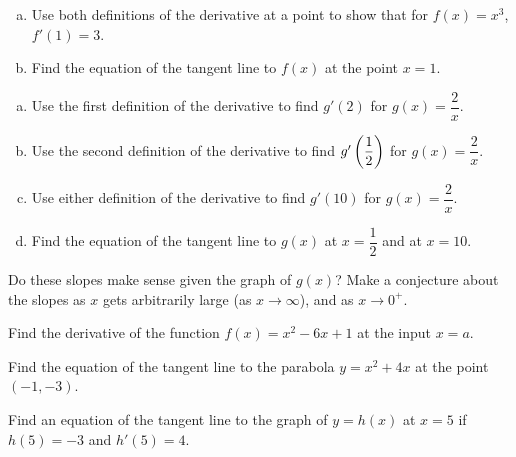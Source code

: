 \documentclass[notes]{subfiles}
\begin{document}
		\begin{ex}
			\begin{enumerate}[(a)]
				\item Use both definitions of the derivative at a point to show that for $f(x) = x^3$, $f'(1) = 3$.
					
				\item Find the equation of the tangent line to $f(x)$ at the point $x = 1$.
					
			\end{enumerate}
		\end{ex}
			\newpage		
		\begin{ex}
			\begin{enumerate}[(a)]
				\item Use the first definition of the derivative to find $g'(2)$ for $g(x) = \dfrac{2}{x}$.
					\vs{1}
					
				\item Use the second definition of the derivative to find $g'\left( \dfrac{1}{2}\right)$ for $g(x) = \dfrac{2}{x}$.
					\vs{1}
					
				\item Use either definition of the derivative to find $g'(10)$ for $g(x) = \dfrac{2}{x}$.
					\vs{1}
					
				\item Find the equation of the tangent line to $g(x)$ at $x = \dfrac{1}{2}$ and at $x = 10$.
					\vs{1}					
			\end{enumerate}  
		\end{ex}
			\newpage

		\begin{question}
			Do these slopes make sense given the graph of $g(x)$?  Make a conjecture about the slopes as $x$ gets arbitrarily large (as $x\to \infty$), and as $x\to 0^+$.
		\end{question}

		\begin{ex}
			Find the derivative of the function $f(x) = x^2-6x+1$ at the input $x = a$.
		\end{ex}
			\vs{2}
			
		\begin{ex}
			Find the equation of the tangent line to the parabola $y = x^2 + 4x$ at the point $(-1,-3)$.
		\end{ex}
			\vs{2}
			\newpage
			
		\begin{ex}
			Find an equation of the tangent line to the graph of $y = h(x)$ at $x = 5$ if $h(5) = -3$ and $h'(5) = 4$.
		\end{ex}
			
\end{document}
